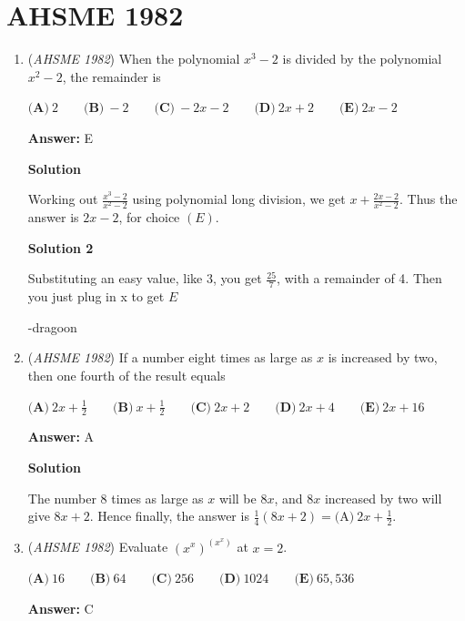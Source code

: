 \section{AHSME 1982}
        \begin{enumerate}
        	\item (\textit{AHSME 1982}) When the polynomial $x^3-2$ is divided by the polynomial $x^2-2$, the remainder is 


 $\textbf{(A)} \ 2 \qquad  \textbf{(B)} \ -2 \qquad  \textbf{(C)} \ -2x-2 \qquad  \textbf{(D)} \ 2x+2 \qquad  \textbf{(E)} \ 2x-2$

 \textbf{Answer: }E



\textbf{Solution}

Working out $\frac{x^3-2}{x^2-2}$ using polynomial long division, we get $x + \frac{2x-2}{x^2-2}$. Thus the answer is $2x -2$, for choice $\boxed{(E)}$.

 



\textbf{Solution 2}

Substituting an easy value, like $3$, you get $\frac{25}{7}$, with a remainder of 4. Then you just plug in x to get $E$

 -dragoon

 


	\item (\textit{AHSME 1982}) If a number eight times as large as $x$ is increased by two, then one fourth of the result equals 


 $\textbf{(A)} \ 2x + \frac{1}{2} \qquad  \textbf{(B)} \ x + \frac{1}{2} \qquad  \textbf{(C)} \ 2x+2 \qquad  \textbf{(D)}\ 2x+4 \qquad \textbf{(E)}\ 2x+16$

 \textbf{Answer: }A



\textbf{Solution}

The number $8$ times as large as $x$ will be $8x$, and $8x$ increased by two will give $8x+2$. Hence finally, the answer is $\frac{1}{4}(8x+2) = \boxed{\text{(A)}\ 2x + \frac{1}{2}}$.

 


	\item (\textit{AHSME 1982}) Evaluate $(x^x)^{(x^x)}$ at $x = 2$. 


 $\textbf{(A)} \ 16 \qquad  \textbf{(B)} \ 64 \qquad  \textbf{(C)} \ 256 \qquad  \textbf{(D)} \ 1024 \qquad  \textbf{(E)} \ 65,536$

 \textbf{Answer: }C




\end{enumerate}
